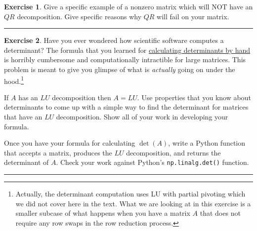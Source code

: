 \documentclass[
]{book}
\theoremstyle{definition}
\theoremstyle{definition}
\theoremstyle{definition}
\newtheorem{exercise}{Exercise}[chapter]
\theoremstyle{remark}
\begin{document}
\begin{exercise}
\protect\hypertarget{exr:unnamed-chunk-386}{}{\label{exr:unnamed-chunk-386} }Give a specific example of a nonzero matrix which will NOT have an \(QR\) decomposition. Give specific reasons why \(QR\) will fail on your matrix.
\end{exercise}

\begin{center}\rule{0.5\linewidth}{0.5pt}\end{center}

\begin{exercise}
\protect\hypertarget{exr:unnamed-chunk-387}{}{\label{exr:unnamed-chunk-387} }Have you ever wondered how scientific software computes a determinant? The formula that you learned for \href{https://en.wikipedia.org/wiki/Determinant}{calculating determinants by hand} is horribly cumbersome and computationally intractible for large matrices. This problem is meant to give you glimpse of what is \emph{actually} going on under the hood.\footnote{Actually, the determinant computation uses LU with partial pivoting which we did not cover here in the text. What we are looking at in this exercise is a smaller subcase of what happens when you have a matrix \(A\) that does not require any row swaps in the row reduction process.}

If \(A\) has an \(LU\) decomposition then \(A = LU\). Use properties that you know about determinants to come up with a simple way to find the determinant for matrices that have an \(LU\) decomposition. Show all of your work in developing your formula.

Once you have your formula for calculating \(\det(A)\), write a Python function that accepts a matrix, produces the \(LU\) decomposition, and returns the determinant of \(A\). Check your work against Python's \texttt{np.linalg.det()} function.
\end{exercise}

\begin{center}\rule{0.5\linewidth}{0.5pt}\end{center}
\end{document}
